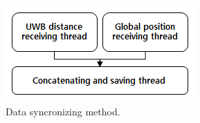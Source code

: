 \documentclass[letterpaper, 10 pt, conference]{ieeeconf}  %
\begin{document}
 \begin{figure}[h]
 	\centering
 	\includegraphics[width=.9\linewidth]{savingThread}
 	\caption{Data syncronizing method.}
 	\label{fig:test}
 \end{figure}
 
\end{document}
